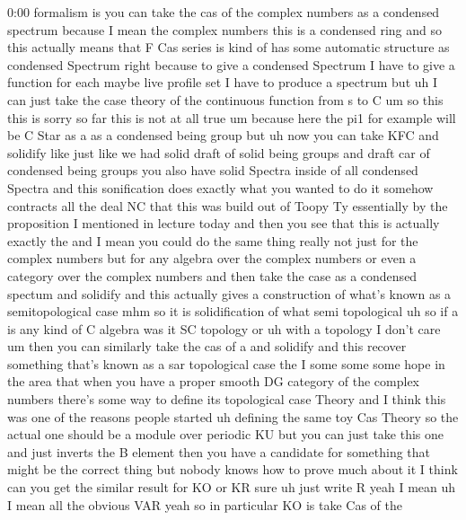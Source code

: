 \begin{unfinished}{0:00}
formalism  is  you  can  take  the  cas  of  the
complex  numbers  as  a  condensed  spectrum
because  I  mean  the  complex
numbers  this  is  a  condensed
ring  and  so  this  actually  means  that  F
Cas  series  is  kind  of  has  some  automatic
structure  as  condensed
Spectrum  right  because  to  give  a
condensed  Spectrum  I  have  to  give  a
function  for  each  maybe  live  profile  set
I  have  to  produce  a  spectrum  but  uh  I
can  just  take  the  case  theory  of  the
continuous  function  from  s  to
C  um  so  this  this  is  sorry  so  far  this
is  not  at  all  true  um  because  here  the
pi1  for  example  will  be  C  Star  as  a  as  a
condensed  being
group  but  uh  now  you  can  take
KFC  and
solidify  like  just  like  we  had  solid
draft  of  solid  being  groups  and  draft
car  of  condensed  being  groups  you  also
have  solid  Spectra  inside  of  all
condensed
Spectra  and  this  sonification  does
exactly  what  you  wanted  to  do  it  somehow
contracts  all  the  deal  NC  that  this  was
build  out  of  Toopy  Ty  essentially  by  the
proposition  I  mentioned  in  lecture  today
and  then  you  see  that  this  is  actually
exactly
the  and  I  mean  you  could  do  the  same
thing  really  not  just  for  the  complex
numbers  but  for  any  algebra  over  the
complex  numbers  or  even  a  category  over
the  complex  numbers  and  then  take  the
case  as  a  condensed  spectum  and  solidify
and  this  actually  gives  a  construction
of  what's  known  as  a  semitopological
case
mhm  so  it  is  solidification  of  what  semi
topological  uh
so  if  a  is  any  kind  of  C
algebra  was  it  SC  topology  or
uh  with  a  topology  I  don't  care
um  then  you  can  similarly  take  the  cas
of  a
and
solidify  and  this  recover  something
that's  known  as  a  sar  topological  case
the  I  some  some  some  hope  in  the  area
that  when  you  have  a  proper  smooth  DG
category  of  the  complex  numbers  there's
some  way  to  define  its  topological  case
Theory  and  I  think  this  was  one  of  the
reasons  people  started  uh  defining  the
same  toy  Cas  Theory  so  the  actual  one
should  be  a  module  over  periodic  KU  but
you  can  just  take  this  one  and  just
inverts  the  B  element  then  you  have  a
candidate  for  something  that  might  be
the  correct  thing  but  nobody  knows  how
to  prove  much  about  it  I
think  can  you  get  the  similar  result  for
KO  or  KR
sure  uh  just  write
R  yeah  I
mean  uh  I  mean  all  the  obvious  VAR  yeah
so  in  particular  KO  is  take  Cas  of  the

\end{unfinished}
